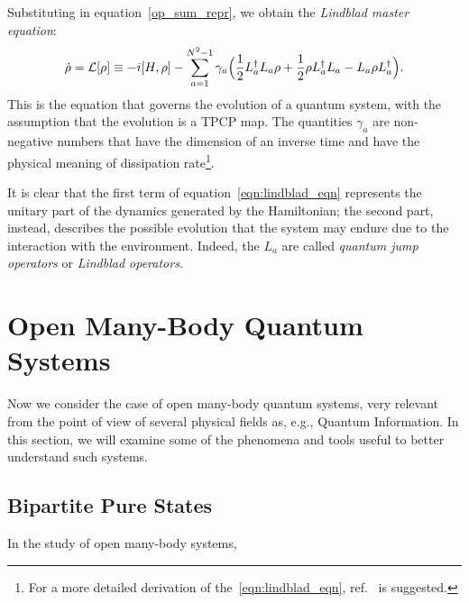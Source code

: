 Substituting in equation~\ref{op_sum_repr}, we obtain the \emph{Lindblad master equation}:
\begin{equation}
\label{eqn:lindblad_eqn}
    \dot{\rho} = \mathcal{L}[\rho] \equiv -i[H, \rho] - \sum_{a=1}^{N^2-1} \gamma_a \Bigl(\frac{1}{2}L_a^{\dagger}L_a\rho + \frac{1}{2}\rho L_a^{\dagger}L_a - L_a\rho L_a^{\dagger}\Bigl).
\end{equation}
This is the equation that governs the evolution of a quantum system, with the assumption that the evolution is a TPCP map. The quantities $\gamma_a$ are non-negative numbers that have the dimension of an inverse time and have the physical meaning of dissipation rate\footnote{For a more detailed derivation of the~\ref{eqn:lindblad_eqn}, ref.~\cite{pet_breuer:open_quantum} is suggested.}.

It is clear that the first term of equation~\ref{eqn:lindblad_eqn} represents the unitary part of the dynamics generated by the Hamiltonian; the second part, instead, describes the possible evolution that the system may endure due to the interaction with the environment. Indeed, the $L_a$ are called \emph{quantum jump operators} or \emph{Lindblad operators}.



\section{Open Many-Body Quantum Systems}
\label{many_body_oqs}
Now we consider the case of open many-body quantum systems, very relevant from the point of view of several physical fields as, e.g., Quantum Information. In this section, we will examine some of the phenomena and tools useful to better understand such systems. 

\subsection{Bipartite Pure States}
In the study of open many-body systems, 

